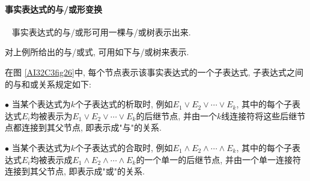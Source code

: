 \paragraph{事实表达式的与/或形变换}~{}
    事实表达式的与/或形可用一棵与/或树表示出来.
\begin{example}
对上例所给出的与/或式, 可用如下与/或树来表示.

在图 \ref{AI32C3fig26}中, 每个节点表示该事实表达式的一个子表达式, 子表达式之间的与和或关系规定如下:

$\bullet$ 当某个表达式为$k$个子表达式的析取时, 例如$E_1\vee E_2\vee \cdots \vee E_k$, 其中的每个子表达式$E_i$均被表示为$E_1\vee E_2\vee \cdots \vee E_k$的后继节点, 并由一个$k$线连接符将这些后继节点都连接到其父节点, 即表示成"与"的关系.

$\bullet$ 当某个表达式为$k$个子表达式的合取时, 例如$E_1\wedge E_2\wedge \cdots \wedge E_k$, 其中的每个子表达式$E_i$均被表示成$E_1\wedge E_2\wedge \cdots \wedge E_k$的一个单一的后继节点, 并由一个单一连接符连接到其父节点, 即表示成"或"的关系.
\begin{figure}[H]
\begin{center}
\end{center}
\end{figure}
\end{example}
